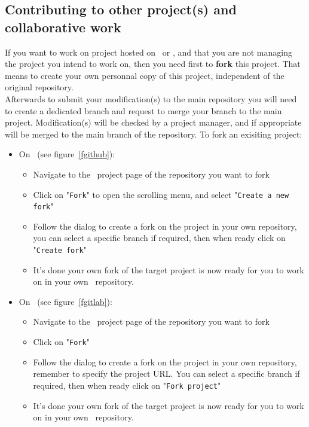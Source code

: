 \subsection{Contributing to other project(s) and collaborative work}

If you want to work on project hosted on \github\ or \gitlab, and that you are not managing the project you intend to work on, then you need first to {\bf{fork}} this project. 
That means to create your own personnal copy of this project, independent of the original repository. \\
Afterwards to submit your modification(s) to the main repository you will need to create a dedicated branch and request to merge your branch to the main project. 
Modification(s) will be checked by a project manager, and if appropriate will be merged to the main branch of the repository. 
\newpage
\noindent To fork an exisiting project:
\begin{itemize}
\item On \github\ (see figure~\ref{fgithub}):
\begin{itemize}
\item Navigate to the \github\ project page of the repository you want to fork
\item Click on "\texttt{Fork}" to open the scrolling menu, and select "\texttt{Create a new fork}"
\item Follow the dialog to create a fork on the project in your own repository, you can select a specific branch if required, then when ready click on "\texttt{Create fork}"
\item It's done your own fork of the target project is now ready for you to work on in your own \github\ repository. 
\end{itemize}
\item On \gitlab\ (see figure~\ref{fgitlab}):
\begin{itemize}
\item Navigate to the \gitlab\ project page of the repository you want to fork
\item Click on "\texttt{Fork}"
\item Follow the dialog to create a fork on the project in your own repository, remember to specify the project URL. You can select a specific branch if required, then when ready click on "\texttt{Fork project}"
\item It's done your own fork of the target project is now ready for you to work on in your own \gitlab\ repository. 
\end{itemize}
\end{itemize}

